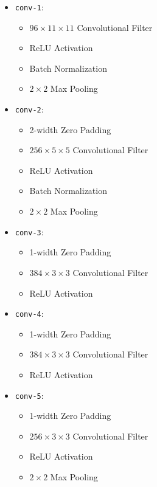 \begin{figure}
\begin{mdframed}
\begin{itemize}
    \item \texttt{conv-1}:
    \begin{itemize}
        \item $96 \times 11 \times 11$ Convolutional Filter
        \item ReLU Activation
        \item Batch Normalization
        \item $2 \times 2$ Max Pooling
    \end{itemize}
    \item \texttt{conv-2}:
    \begin{itemize}
        \item 2-width Zero Padding
        \item $256 \times 5 \times 5$ Convolutional Filter
        \item ReLU Activation
        \item Batch Normalization
        \item $2 \times 2$ Max Pooling
    \end{itemize}
    \item \texttt{conv-3}:
    \begin{itemize}
        \item 1-width Zero Padding
        \item $384 \times 3 \times 3$ Convolutional Filter
        \item ReLU Activation
    \end{itemize}
    \item \texttt{conv-4}:
    \begin{itemize}
        \item 1-width Zero Padding
        \item $384 \times 3 \times 3$ Convolutional Filter
        \item ReLU Activation
    \end{itemize}
    \item \texttt{conv-5}:
    \begin{itemize}
        \item 1-width Zero Padding
        \item $256 \times 3 \times 3$ Convolutional Filter
        \item ReLU Activation
        \item $2 \times 2$ Max Pooling
    \end{itemize}

\end{itemize}
\end{mdframed}
\end{figure}
